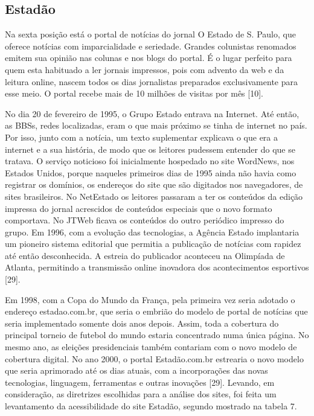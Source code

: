 \documentclass[a4paper]{article}
\begin{document}
\begin{titlepage}
\subsection{Estadão}

Na sexta posição está o portal de notícias do jornal O Estado de S. Paulo, que oferece notícias com imparcialidade e seriedade. Grandes colunistas renomados emitem sua opinião nas colunas e nos blogs do portal. É o lugar perfeito para quem esta habituado a ler jornais impressos, pois com advento da web e da leitura online, nascem todos os dias jornalistas preparados exclusivamente para esse meio. O portal recebe mais de 10 milhões de visitas por mês [10].

No dia 20 de fevereiro de 1995, o Grupo Estado entrava na Internet. Até então, as BBSs, redes localizadas, eram o que mais próximo se tinha de internet no país. Por isso, junto com a notícia, um texto suplementar explicava o que era a internet e a sua história, de modo que os leitores pudessem entender do que se tratava. O serviço noticioso foi inicialmente hospedado no site WordNews, nos Estados Unidos, porque naqueles primeiros dias de 1995 ainda não havia como registrar os domínios, os endereços do site que são digitados nos navegadores, de sites brasileiros. No NetEstado os leitores passaram a ter os conteúdos da edição impressa do jornal acrescidos de conteúdos especiais que o novo formato comportava. No JTWeb ficava os conteúdos do outro periódico impresso do grupo. Em 1996, com a evolução das tecnologias, a Agência Estado implantaria um pioneiro sistema editorial que permitia a publicação de notícias com rapidez até então desconhecida. A estreia do publicador aconteceu na Olimpíada de Atlanta, permitindo a transmissão online inovadora dos acontecimentos esportivos [29].

Em 1998, com a Copa do Mundo da França, pela primeira vez seria adotado o endereço estadao.com.br, que seria o embrião do modelo de portal de notícias que seria implementado somente dois anos depois. Assim, toda a cobertura do principal torneio de futebol do mundo estaria concentrado numa única página. No mesmo ano, as eleições presidenciais também contariam com o novo modelo de cobertura digital. No ano 2000, o portal Estadão.com.br estrearia o novo modelo que seria aprimorado até os dias atuais, com a incorporações das novas tecnologias, linguagem, ferramentas e outras inovações [29].  Levando, em consideração, as diretrizes escolhidas para a análise dos sites, foi feita um levantamento da acessibilidade do site Estadão, segundo mostrado na tabela 7.\\


\end{titlepage}
\end{document}
